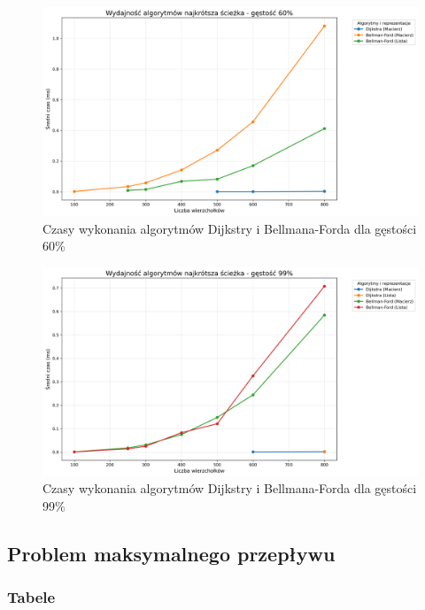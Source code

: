 \documentclass{article}
\begin{document}
\begin{figure}[H]
    \centering
    \includegraphics[scale=0.4]{../Python/charts_type2/Typ2_SHORTEST_PATH_gestosc60_wykres.png}
    \caption{Czasy wykonania algorytmów Dijkstry i Bellmana-Forda dla gęstości 60\%}
\end{figure}

\begin{figure}[H]
    \centering
    \includegraphics[scale=0.4]{../Python/charts_type2/Typ2_SHORTEST_PATH_gestosc99_wykres.png}
    \caption{Czasy wykonania algorytmów Dijkstry i Bellmana-Forda dla gęstości 99\%}
\end{figure}

\subsection{Problem maksymalnego przepływu}

\subsubsection{Tabele}
\datatable
\end{document}
